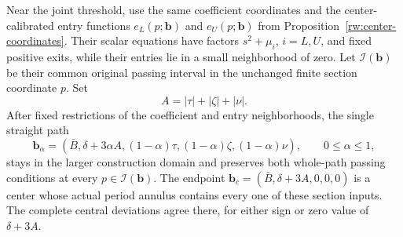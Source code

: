 \begin{proposition}
\label{rw:domains:contact}
Near the joint threshold, use the same coefficient coordinates and the
center-calibrated entry functions $e_L(p;\mathbf b)$ and
$e_U(p;\mathbf b)$ from Proposition~\ref{rw:center-coordinates}.
Their scalar equations have factors $s^2+\mu_i$, $i=L,U$,
and fixed positive exits, while their entries lie in a small
neighborhood of zero. Let $\mathcal I(\mathbf b)$ be their common
original passing interval in the unchanged finite section coordinate
$p$. Set
\[
 A=|\tau|+|\zeta|+|\nu|.
\]
After fixed restrictions of the coefficient and entry neighborhoods,
the single straight path
\begin{equation}\label{rw:domains:contact-path}
 \mathbf b_\alpha=(\bar B,\delta+3\alpha A,
 (1-\alpha)\tau,(1-\alpha)\zeta,(1-\alpha)\nu),
 \qquad0\le\alpha\le1,
\end{equation}
stays in the larger construction domain and preserves both whole-path
passing conditions at every $p\in\mathcal I(\mathbf b)$.
The endpoint $\mathbf b_c=(\bar B,\delta+3A,0,0,0)$ is a center
whose actual period annulus contains every one of these section
inputs. The complete central deviations agree there, for either sign
or zero value of $\delta+3A$.
\end{proposition}

